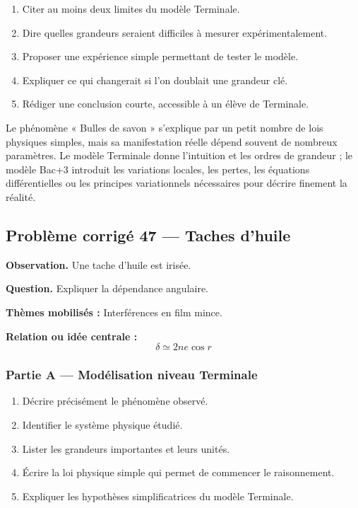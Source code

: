 \documentclass[11pt,a4paper]{article}
\begin{document}
\begin{enumerate}
  \item Citer au moins deux limites du modèle Terminale.
  \item Dire quelles grandeurs seraient difficiles à mesurer expérimentalement.
  \item Proposer une expérience simple permettant de tester le modèle.
  \item Expliquer ce qui changerait si l'on doublait une grandeur clé.
  \item Rédiger une conclusion courte, accessible à un élève de Terminale.
\end{enumerate}

\begin{corrigebox}
Le phénomène « Bulles de savon » s'explique par un petit nombre de lois physiques simples, mais sa manifestation réelle dépend souvent de nombreux paramètres. Le modèle Terminale donne l'intuition et les ordres de grandeur ; le modèle Bac+3 introduit les variations locales, les pertes, les équations différentielles ou les principes variationnels nécessaires pour décrire finement la réalité.
\end{corrigebox}

\subsection{Problème corrigé 47 — Taches d'huile}

\begin{exercicebox}
\textbf{Observation.} Une tache d'huile est irisée.

\medskip
\textbf{Question.} Expliquer la dépendance angulaire.

\medskip
\textbf{Thèmes mobilisés :} Interférences en film mince.

\medskip
\textbf{Relation ou idée centrale :}
\[
\delta\simeq2ne\cos r
\]
\end{exercicebox}

\subsubsection*{Partie A — Modélisation niveau Terminale}

\begin{enumerate}
  \item Décrire précisément le phénomène observé.
  \item Identifier le système physique étudié.
  \item Lister les grandeurs importantes et leurs unités.
  \item Écrire la loi physique simple qui permet de commencer le raisonnement.
  \item Expliquer les hypothèses simplificatrices du modèle Terminale.
\end{enumerate}
\end{document}
